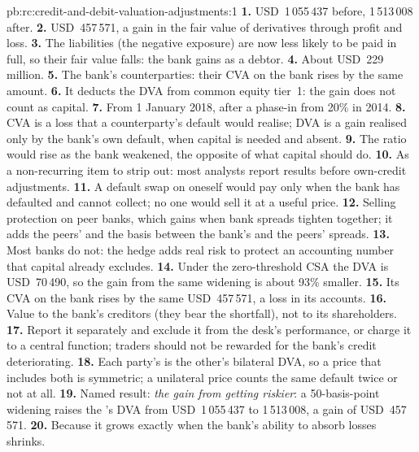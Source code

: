 \begin{solution}{pb:rc:credit-and-debit-valuation-adjustments:1}
\textbf{1.} USD~1\,055\,437 before, 1\,513\,008 after.
\textbf{2.} USD~457\,571, a gain in the fair value of derivatives through profit and loss.
\textbf{3.} The liabilities (the negative exposure) are now less likely to be paid in full, so
their fair value falls: the bank gains as a debtor.
\textbf{4.} About USD~229 million.
\textbf{5.} The bank's counterparties: their CVA on the bank rises by the same amount.
\textbf{6.} It deducts the DVA from common equity tier~1: the gain does not count as capital.
\textbf{7.} From 1 January 2018, after a phase-in from 20\% in 2014.
\textbf{8.} CVA is a loss that a counterparty's default would realise; DVA is a gain realised only
by the bank's own default, when capital is needed and absent.
\textbf{9.} The ratio would rise as the bank weakened, the opposite of what capital should do.
\textbf{10.} As a non-recurring item to strip out: most analysts report results before own-credit
adjustments.
\textbf{11.} A default swap on oneself would pay only when the bank has defaulted and cannot
collect; no one would sell it at a useful price.
\textbf{12.} Selling protection on peer banks, which gains when bank spreads tighten together;
it adds the peers'  and the basis between the bank's and the peers' spreads.
\textbf{13.} Most banks do not: the hedge adds real risk to protect an accounting number that
capital already excludes.
\textbf{14.} Under the zero-threshold CSA the DVA is USD~70\,490, so the gain from the same
widening is about 93\% smaller.
\textbf{15.} Its CVA on the bank rises by the same USD~457\,571, a loss in its accounts.
\textbf{16.} Value to the bank's creditors (they bear the shortfall), not to its shareholders.
\textbf{17.} Report it separately and exclude it from the desk's performance, or charge it to a
central function; traders should not be rewarded for the bank's credit deteriorating.
\textbf{18.} Each party's  is the other's bilateral DVA, so a price that includes
both is symmetric; a unilateral price counts the same default twice or not at all.
\textbf{19.} Named result: \emph{the gain from getting riskier}: a 50-basis-point widening raises the
's DVA from USD~1\,055\,437 to 1\,513\,008, a gain of USD~457\,571.
\textbf{20.} Because it grows exactly when the bank's ability to absorb losses shrinks.
\end{solution}

